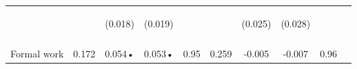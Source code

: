 \begin{tabular}{lccccccccc}
 & \begin{footnotesize}\end{footnotesize} & \begin{footnotesize}(0.018)\end{footnotesize} & \begin{footnotesize}(0.019)\end{footnotesize} & \begin{footnotesize}\end{footnotesize} & \begin{footnotesize}\end{footnotesize} & \begin{footnotesize}(0.025)\end{footnotesize} & \begin{footnotesize}(0.028)\end{footnotesize} & \begin{footnotesize}\end{footnotesize} & \begin{footnotesize}\end{footnotesize}\\
 & \begin{footnotesize}\end{footnotesize} & \begin{footnotesize}[0.215]\end{footnotesize} & \begin{footnotesize}[0.004]\end{footnotesize} & \begin{footnotesize}\end{footnotesize} & \begin{footnotesize}\end{footnotesize} & \begin{footnotesize}[0.411]\end{footnotesize} & \begin{footnotesize}[1.000]\end{footnotesize} & \begin{footnotesize}\end{footnotesize} & \begin{footnotesize}\end{footnotesize}\\
\noalign{\smallskip}Formal work & 0.172 & 0.054• & 0.053• & 0.95 & 0.259 & -0.005 & -0.007 & 0.96 & \\

\end{tabular}
